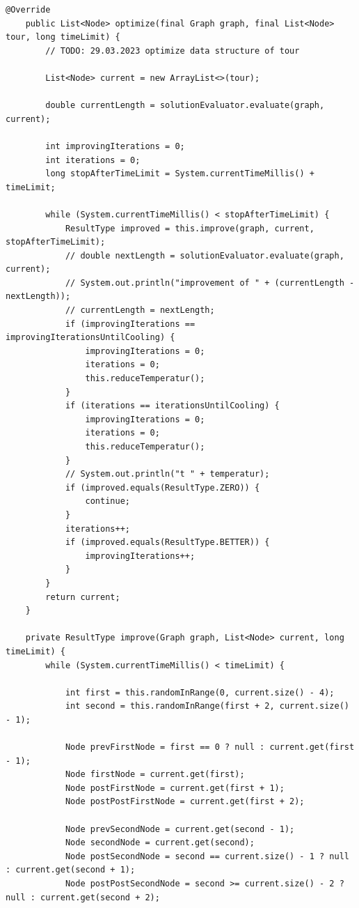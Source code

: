 \begin{lstlisting}[label={lst:source}]
    @Override
    public List<Node> optimize(final Graph graph, final List<Node> tour, long timeLimit) {
        // TODO: 29.03.2023 optimize data structure of tour

        List<Node> current = new ArrayList<>(tour);

        double currentLength = solutionEvaluator.evaluate(graph, current);

        int improvingIterations = 0;
        int iterations = 0;
        long stopAfterTimeLimit = System.currentTimeMillis() + timeLimit;

        while (System.currentTimeMillis() < stopAfterTimeLimit) {
            ResultType improved = this.improve(graph, current, stopAfterTimeLimit);
            // double nextLength = solutionEvaluator.evaluate(graph, current);
            // System.out.println("improvement of " + (currentLength - nextLength));
            // currentLength = nextLength;
            if (improvingIterations == improvingIterationsUntilCooling) {
                improvingIterations = 0;
                iterations = 0;
                this.reduceTemperatur();
            }
            if (iterations == iterationsUntilCooling) {
                improvingIterations = 0;
                iterations = 0;
                this.reduceTemperatur();
            }
            // System.out.println("t " + temperatur);
            if (improved.equals(ResultType.ZERO)) {
                continue;
            }
            iterations++;
            if (improved.equals(ResultType.BETTER)) {
                improvingIterations++;
            }
        }
        return current;
    }

    private ResultType improve(Graph graph, List<Node> current, long timeLimit) {
        while (System.currentTimeMillis() < timeLimit) {

            int first = this.randomInRange(0, current.size() - 4);
            int second = this.randomInRange(first + 2, current.size() - 1);

            Node prevFirstNode = first == 0 ? null : current.get(first - 1);
            Node firstNode = current.get(first);
            Node postFirstNode = current.get(first + 1);
            Node postPostFirstNode = current.get(first + 2);

            Node prevSecondNode = current.get(second - 1);
            Node secondNode = current.get(second);
            Node postSecondNode = second == current.size() - 1 ? null : current.get(second + 1);
            Node postPostSecondNode = second >= current.size() - 2 ? null : current.get(second + 2);


\end{lstlisting}
